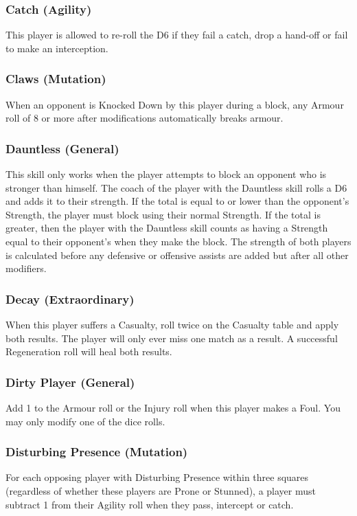 \documentclass{article}
\begin{document}
\begin{multicols}{3}
\subsubsection{Catch (Agility)}
\par This player is allowed to re-roll the D6 if they fail a catch, drop a hand-off or fail to make an interception.

\subsubsection{Claws (Mutation)}
\par When an opponent is Knocked Down by this player during a block, any Armour roll of 8 or more after modifications automatically breaks armour.

\subsubsection{Dauntless (General)}
\par This skill only works when the player attempts to block an opponent who is stronger than himself. The coach of the player with the Dauntless skill rolls a D6 and adds it to their strength. If the total is equal to or lower than the opponent's Strength, the player must block using their normal Strength. If the total is greater, then the player with the Dauntless skill counts as having a Strength equal to their opponent's when they make the block. The strength of both players is calculated before any defensive or offensive assists are added but after all other modifiers.

\subsubsection{Decay (Extraordinary)}
\par When this player suffers a Casualty, roll twice on the Casualty table and apply both results. The player will only ever miss one match as a result. A successful Regeneration roll will heal both results.

\subsubsection{Dirty Player (General)}
\par Add 1 to the Armour roll or the Injury roll when this player makes a Foul. You may only modify one of the dice rolls.

\subsubsection{Disturbing Presence (Mutation)}
\par For each opposing player with Disturbing Presence within three squares (regardless of whether these players are Prone or Stunned), a player must subtract 1 from their Agility roll when they pass, intercept or catch.


\end{multicols}
\end{document}
